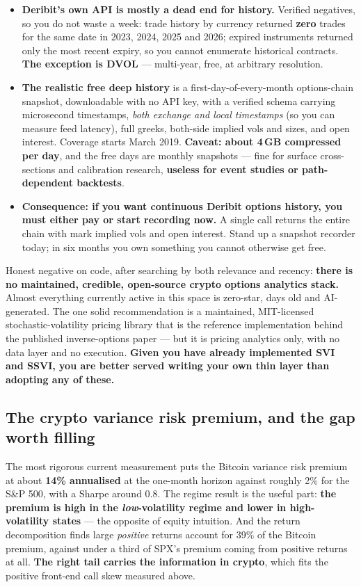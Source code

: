 \documentclass[11pt,a4paper]{article}
\newcommand{\srcnote}[1]{{\footnotesize\color{soft}#1\par}}
\begin{document}
\begin{itemize}
\item \textbf{Deribit's own API is mostly a dead end for history.} Verified
negatives, so you do not waste a week: trade history by currency returned
\textbf{zero} trades for the same date in 2023, 2024, 2025 and 2026; expired
instruments returned only the most recent expiry, so you cannot enumerate
historical contracts. \textbf{The exception is DVOL} --- multi-year, free, at
arbitrary resolution.
\item \textbf{The realistic free deep history} is a first-day-of-every-month
options-chain snapshot, downloadable with no API key, with a verified schema
carrying microsecond timestamps, \emph{both exchange and local timestamps} (so you
can measure feed latency), full greeks, both-side implied vols and sizes, and open
interest. Coverage starts March 2019. \textbf{Caveat: about 4\,GB compressed per
day}, and the free days are monthly snapshots --- fine for surface cross-sections
and calibration research, \textbf{useless for event studies or path-dependent
backtests}.
\item \textbf{Consequence: if you want continuous Deribit options history, you
must either pay or start recording now.} A single call returns the entire chain
with mark implied vols and open interest. Stand up a snapshot recorder today; in
six months you own something you cannot otherwise get free.
\end{itemize}

\srcnote{Honest negative on code, after searching by both relevance and recency:
\textbf{there is no maintained, credible, open-source crypto options analytics
stack.} Almost everything currently active in this space is zero-star, days old
and AI-generated. The one solid recommendation is a maintained, MIT-licensed
stochastic-volatility pricing library that is the reference implementation behind
the published inverse-options paper --- but it is pricing analytics only, with no
data layer and no execution. \textbf{Given you have already implemented SVI and
SSVI, you are better served writing your own thin layer than adopting any of these.}}

\subsection{The crypto variance risk premium, and the gap worth filling}

The most rigorous current measurement puts the Bitcoin variance risk premium at
about \textbf{14\% annualised} at the one-month horizon against roughly 2\% for
the S\&P 500, with a Sharpe around 0.8. The regime result is the useful part:
\textbf{the premium is high in the \emph{low}-volatility regime and lower in
high-volatility states} --- the opposite of equity intuition. And the return
decomposition finds large \emph{positive} returns account for 39\% of the Bitcoin
premium, against under a third of SPX's premium coming from positive returns at
all. \textbf{The right tail carries the information in crypto}, which fits the
positive front-end call skew measured above.
\end{document}
